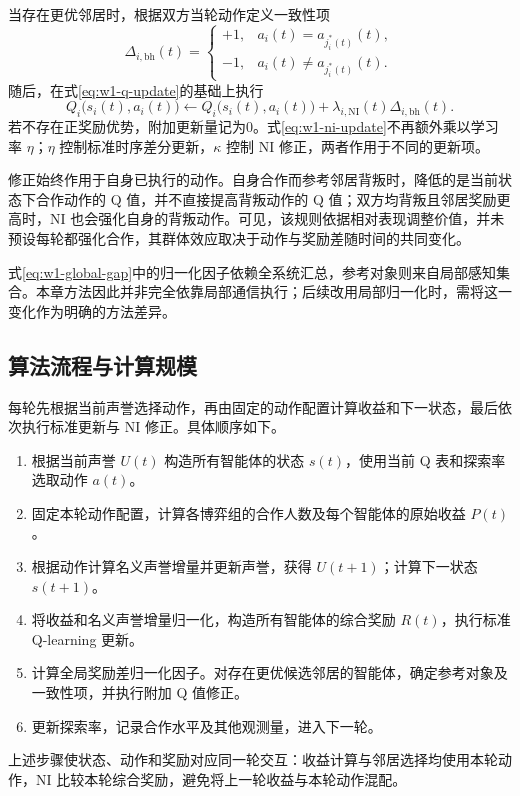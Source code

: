 当存在更优邻居时，根据双方当轮动作定义一致性项
\begin{equation}
 \Delta_{i,\mathrm{bh}}(t)=
 \begin{cases}+1,&a_i(t)=a_{j_i^*(t)}(t),\\-1,&a_i(t)\neq a_{j_i^*(t)}(t).
 \end{cases}
 \label{eq:w1-consistency}
\end{equation}
随后，在式\eqref{eq:w1-q-update}的基础上执行
\begin{equation}
 Q_i\bigl(s_i(t),a_i(t)\bigr)\leftarrow Q_i\bigl(s_i(t),a_i(t)\bigr)
       +\lambda_{i,\mathrm{NI}}(t)\Delta_{i,\mathrm{bh}}(t).
 \label{eq:w1-ni-update}
\end{equation}
若不存在正奖励优势，附加更新量记为0。式\eqref{eq:w1-ni-update}不再额外乘以学习率 $\eta$；$\eta$ 控制标准时序差分更新，$\kappa$ 控制 NI 修正，两者作用于不同的更新项。

修正始终作用于自身已执行的动作。自身合作而参考邻居背叛时，降低的是当前状态下合作动作的 Q 值，并不直接提高背叛动作的 Q 值；双方均背叛且邻居奖励更高时，NI 也会强化自身的背叛动作。可见，该规则依据相对表现调整价值，并未预设每轮都强化合作，其群体效应取决于动作与奖励差随时间的共同变化。

式\eqref{eq:w1-global-gap}中的归一化因子依赖全系统汇总，参考对象则来自局部感知集合。本章方法因此并非完全依靠局部通信执行；后续改用局部归一化时，需将这一变化作为明确的方法差异。

\subsection{算法流程与计算规模}

每轮先根据当前声誉选择动作，再由固定的动作配置计算收益和下一状态，最后依次执行标准更新与 NI 修正。具体顺序如下。
\begin{enumerate}
 \item 根据当前声誉 $U(t)$ 构造所有智能体的状态 $s(t)$，使用当前 Q 表和探索率选取动作 $a(t)$。
 \item 固定本轮动作配置，计算各博弈组的合作人数及每个智能体的原始收益 $P(t)$。
 \item 根据动作计算名义声誉增量并更新声誉，获得 $U(t+1)$；计算下一状态 $s(t+1)$。
 \item 将收益和名义声誉增量归一化，构造所有智能体的综合奖励 $R(t)$，执行标准 Q-learning 更新。
 \item 计算全局奖励差归一化因子。对存在更优候选邻居的智能体，确定参考对象及一致性项，并执行附加 Q 值修正。
 \item 更新探索率，记录合作水平及其他观测量，进入下一轮。
\end{enumerate}
上述步骤使状态、动作和奖励对应同一轮交互：收益计算与邻居选择均使用本轮动作，NI 比较本轮综合奖励，避免将上一轮收益与本轮动作混配。

